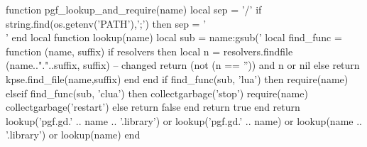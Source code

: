 
\usepackage{longtable}
\usepackage{booktabs}
\usepackage{biocon}
\usepackage{graphicx}
\usepackage{fancyhdr}
\usepackage[T1]{fontenc}
\usepackage[francais]{babel}
\usepackage{caption}
\usepackage[nointegrals]{wasysym} %
\usepackage[margin=2.5cm]{geometry}
\usepackage{latexsym}
\usepackage{subcaption}
\usepackage{tikz}
\usepackage{tikzscale}
\usetikzlibrary{graphs}
\usetikzlibrary{graphdrawing}
\usetikzlibrary{arrows,positioning,decorations.pathreplacing}
\usetikzlibrary{calc}

\usepackage{luacode}
\begin{luacode}
  function pgf_lookup_and_require(name)
    local sep = '/'
    if string.find(os.getenv('PATH'),';') then
      sep = '\string\\'
    end
    local function lookup(name)
      local sub = name:gsub('%
      local find_func = function (name, suffix)
        if resolvers then
          local n = resolvers.findfile (name.."."..suffix, suffix) -- changed
          return (not (n == '')) and n or nil
        else
          return kpse.find_file(name,suffix)
        end
      end
      if find_func(sub, 'lua') then
        require(name)
      elseif find_func(sub, 'clua') then
        collectgarbage('stop')
        require(name)
        collectgarbage('restart')
      else
        return false
      end
      return true
    end
    return
      lookup('pgf.gd.' .. name .. '.library') or
      lookup('pgf.gd.' .. name) or
      lookup(name .. '.library') or
      lookup(name)
  end
\end{luacode}


\usetikzlibrary{quotes}
\usetikzlibrary{shapes.misc} %


\usepackage{booktabs}
\usepackage[shortcuts,nonumberlist]{glossaries} %
\makeglossaries

